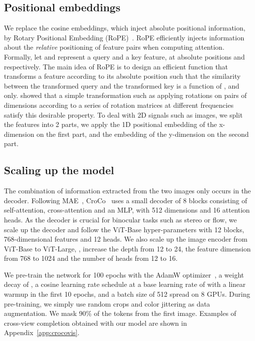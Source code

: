 \documentclass[10pt,twocolumn,letterpaper]{article}
\newcommand{\PAR}[1]{\noindent{\bf{#1.}}}
\begin{document}
\subsection{Positional embeddings}
\label{sub:posembed}

We replace the cosine embeddings, which inject absolute positional information, by Rotary Positional Embedding (RoPE)~\cite{rope}.
RoPE efficiently injects information about the \emph{relative} positioning of feature pairs when computing attention.
Formally, let  and  represent a query and a key feature, at absolute positions  and  respectively.
The main idea of RoPE is to design an efficient function  that transforms a feature  according to its absolute position  such that the similarity between the transformed query and the transformed key  is a function of ,  and  only.
\cite{rope} showed that a simple transformation such as applying rotations on pairs of dimensions according to a series of rotation matrices at different frequencies satisfy this desirable property.
To deal with 2D signals 
such as images, we 
split the features into 2 parts, we apply the 1D positional embedding of the x-dimension on the first part, and the embedding of the y-dimension on the second part.

\subsection{Scaling up the model}
\label{sub:decoder}

The combination of information 
extracted from the two images only occurs in the decoder.
Following MAE~\cite{mae}, CroCo~\cite{croco} uses a small decoder of 8 blocks consisting of self-attention, cross-attention and an MLP, with 512 dimensions and 16 attention heads. As the decoder is crucial for binocular tasks such as stereo or flow, we scale up the decoder and follow the ViT-Base hyper-parameters with 12 blocks, 768-dimensional features and 12 heads. We also scale up the image encoder from ViT-Base to ViT-Large, \ie, increase the depth from 12 to 24, the feature dimension from 768 to 1024 and the number of heads from 12 to 16. 

\PAR{Pre-training detailed setting}
We pre-train the network for 100 epochs with the AdamW optimizer~\cite{adamw}, a weight decay of , a cosine learning rate schedule at a base learning rate of  with a linear warmup in the first 10 epochs, and a batch size of 512 spread on 8 GPUs.
During pre-training, we simply use random crops and color jittering as data augmentation.
We mask 90\% of the tokens from the first image.
Examples of cross-view completion obtained with our model are shown in Appendix~\ref{app:crocovis}.
\end{document}
